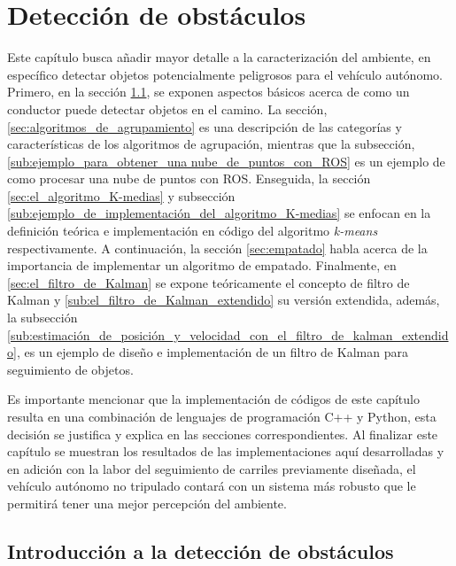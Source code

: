 \chapter{Detección de obstáculos} \label{cap:detección_de_obstáculos}
Este capítulo busca añadir mayor detalle a la caracterización del ambiente, en específico detectar objetos potencialmente peligrosos para el vehículo autónomo. Primero, en la sección \ref{sec:introducción_a_la_detección_de_ obstáculos}, se exponen aspectos básicos acerca de como un conductor puede detectar objetos en el camino. La sección, \ref{sec:algoritmos_de_agrupamiento} es una descripción de las categorías y características de los algoritmos de agrupación, mientras que la subsección, \ref{sub:ejemplo_para_obtener_una nube_de_puntos_con_ROS} es un ejemplo de como procesar una nube de puntos con ROS. Enseguida, la sección \ref{sec:el_algoritmo_K-medias} y subsección \ref{sub:ejemplo_de_implementación_del_algoritmo_K-medias} se enfocan en la definición teórica e implementación en código del algoritmo \textit{k-means} respectivamente. A continuación, la sección \ref{sec:empatado} habla acerca de la importancia de implementar un algoritmo de empatado. Finalmente, en \ref{sec:el_filtro_de_Kalman} se expone teóricamente el concepto de filtro de Kalman y \ref{sub:el_filtro_de_Kalman_extendido} su versión extendida, además, la subsección \ref{sub:estimación_de_posición_y_velocidad_con_el_filtro_de_kalman_extendido}, es un ejemplo de diseño e implementación de un filtro de Kalman para seguimiento de objetos.

Es importante mencionar que la implementación de códigos de este capítulo resulta en una combinación de lenguajes de programación C++ y Python, esta decisión se justifica y explica en las secciones correspondientes. Al finalizar este capítulo se muestran los resultados de las implementaciones aquí desarrolladas y en adición con la labor del seguimiento de carriles previamente diseñada, el vehículo autónomo no tripulado contará con un sistema más robusto que le permitirá tener una mejor percepción del ambiente.

\section{Introducción a la detección de obstáculos} \label{sec:introducción_a_la_detección_de_ obstáculos}

